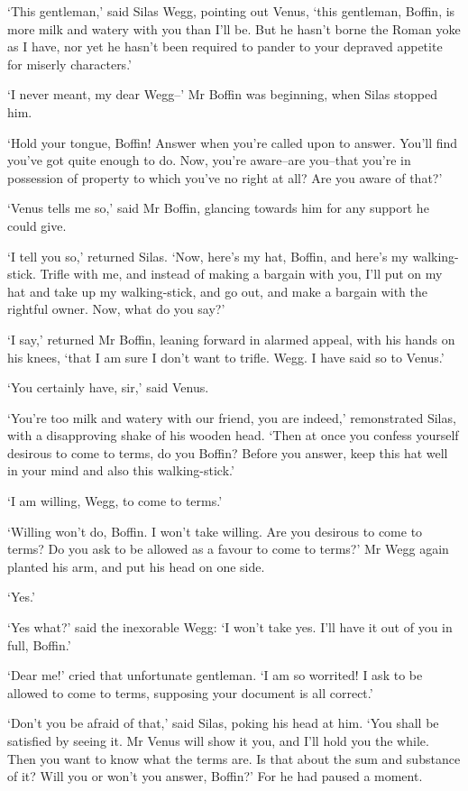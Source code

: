 ‘This gentleman,’ said Silas Wegg, pointing out Venus, ‘this gentleman,
Boffin, is more milk and watery with you than I’ll be. But he hasn’t
borne the Roman yoke as I have, nor yet he hasn’t been required to
pander to your depraved appetite for miserly characters.’

‘I never meant, my dear Wegg--’ Mr Boffin was beginning, when Silas
stopped him.

‘Hold your tongue, Boffin! Answer when you’re called upon to answer.
You’ll find you’ve got quite enough to do. Now, you’re aware--are
you--that you’re in possession of property to which you’ve no right at
all? Are you aware of that?’

‘Venus tells me so,’ said Mr Boffin, glancing towards him for any
support he could give.

‘I tell you so,’ returned Silas. ‘Now, here’s my hat, Boffin, and here’s
my walking-stick. Trifle with me, and instead of making a bargain with
you, I’ll put on my hat and take up my walking-stick, and go out, and
make a bargain with the rightful owner. Now, what do you say?’

‘I say,’ returned Mr Boffin, leaning forward in alarmed appeal, with his
hands on his knees, ‘that I am sure I don’t want to trifle. Wegg. I have
said so to Venus.’

‘You certainly have, sir,’ said Venus.

‘You’re too milk and watery with our friend, you are indeed,’
remonstrated Silas, with a disapproving shake of his wooden head. ‘Then
at once you confess yourself desirous to come to terms, do you Boffin?
Before you answer, keep this hat well in your mind and also this
walking-stick.’

‘I am willing, Wegg, to come to terms.’

‘Willing won’t do, Boffin. I won’t take willing. Are you desirous to
come to terms? Do you ask to be allowed as a favour to come to terms?’
Mr Wegg again planted his arm, and put his head on one side.

‘Yes.’

‘Yes what?’ said the inexorable Wegg: ‘I won’t take yes. I’ll have it
out of you in full, Boffin.’

‘Dear me!’ cried that unfortunate gentleman. ‘I am so worrited! I ask to
be allowed to come to terms, supposing your document is all correct.’

‘Don’t you be afraid of that,’ said Silas, poking his head at him. ‘You
shall be satisfied by seeing it. Mr Venus will show it you, and I’ll
hold you the while. Then you want to know what the terms are. Is
that about the sum and substance of it? Will you or won’t you answer,
Boffin?’ For he had paused a moment.

